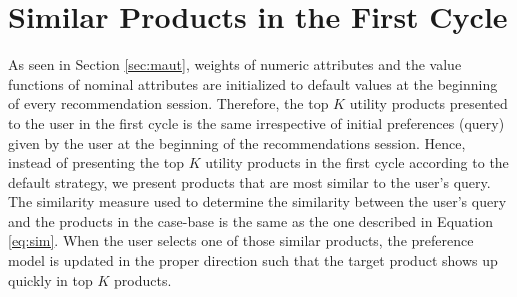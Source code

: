 \section{Similar Products in the First Cycle}
\label{sec:sim}
As seen in Section \ref{sec:maut}, weights of numeric attributes and the value functions of nominal attributes are initialized to default values at the beginning of every recommendation session.
Therefore, the top $K$ utility products presented to the user in the first cycle is the same irrespective of initial preferences (query) given by the user at the beginning of the recommendations session.
Hence, instead of presenting the top $K$ utility products in the first cycle according to the default strategy, we present products that are most similar to the user's query.
The similarity measure used to determine the similarity between the user's query and the products in the case-base is the same as the one described in Equation \ref{eq:sim}.
When the user selects one of those similar products, the preference model is updated in the proper direction such that the target product shows up quickly in top $K$ products.
